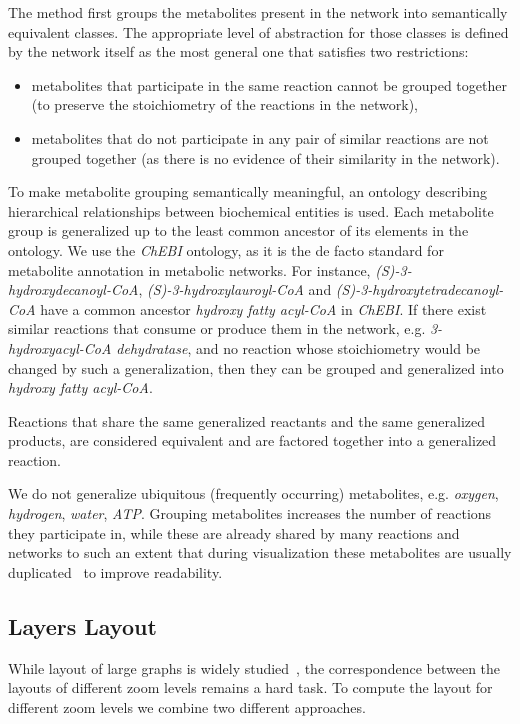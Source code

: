 \documentclass{bmcart}
\begin{document}
The method first groups the metabolites present in the network into semantically equivalent classes. The appropriate level of abstraction for those classes is defined by the network itself as the most general one that satisfies two restrictions: 
\begin{itemize}
 \item metabolites that participate in the same reaction cannot be grouped together (to preserve the stoichiometry of the reactions in the network),
 \item metabolites that do not participate in any pair of similar reactions are not grouped together (as there is no evidence of their similarity in the network).
\end{itemize}
To make metabolite grouping semantically meaningful, an ontology describing hierarchical relationships between biochemical entities is used. Each metabolite group is generalized up to the least common ancestor of its elements in the ontology. We use the \textit{ChEBI} ontology, as it is the de facto standard for metabolite annotation in metabolic networks. %
For instance, \textit{(S)-3-hydroxydecanoyl-CoA}, \textit{(S)-3-hydroxylauroyl-CoA} and \textit{(S)-3-hydroxytetradecanoyl-CoA} have a common ancestor \textit{hydroxy fatty acyl-CoA} in \textit{ChEBI}. If there exist similar reactions that consume or produce them in the network, e.g. \textit{3-hydroxyacyl-CoA dehydratase}, and no reaction whose stoichiometry would be changed by such a generalization, then they can be grouped and generalized into \textit{hydroxy fatty acyl-CoA}.

Reactions that share the same generalized reactants and the same generalized products, are considered equivalent and are factored together into a generalized reaction. 

We do not generalize ubiquitous (frequently occurring) metabolites, e.g. \textit{oxygen}, \textit{hydrogen}, \textit{water}, \textit{ATP}. Grouping metabolites increases the number of reactions they participate in, while these are already shared by many reactions and networks to such an extent that during visualization these metabolites are usually duplicated~\cite{Rohn2012} to improve readability.

\subsection*{Layers Layout}
While layout of large graphs is widely studied~\cite{Unwin2006}, the correspondence between the layouts of different zoom levels remains a hard task. To compute the layout for different zoom levels we combine two different approaches.
\end{document}
